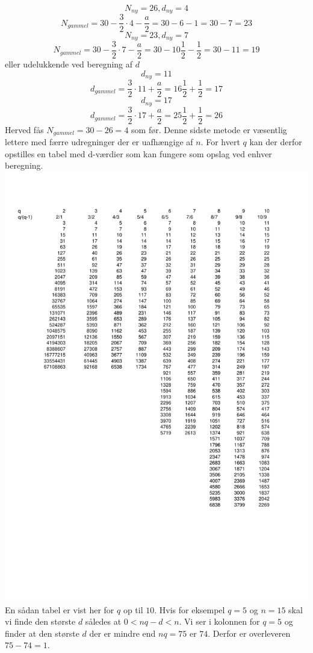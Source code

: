 \[N_{ny}=26, d_{ny}=4\]
\[ N_{gammel}=30-\frac{3}{2} \cdot 4 -\frac{a}{2}=30-6-1=30-7=23\]
\[N_{ny}=23, d_{ny}=7\]
\[ N_{gammel}=30-\frac{3}{2} \cdot 7 -\frac{a}{2}=30-10\frac{1}{2}-\frac{1}{2}=30-11=19\]
eller udelukkende ved beregning af \(d\)
\[d_{ny}=11\]
\[ d_{gammel}=\frac{3}{2} \cdot 11 +\frac{a}{2}=16\frac{1}{2}+\frac{1}{2}=17\]
\[d_{ny}=17\]
\[ d_{gammel}=\frac{3}{2} \cdot 17 +\frac{a}{2}=25\frac{1}{2}+\frac{1}{2}=26\]
Herved fås \(N_{gammel}=30-26=4\) som før. Denne sidste metode er væsentlig lettere med færre udregninger der er uafhængige af \(n\). For hvert \(q\) kan der derfor opstilles en tabel med d-værdier som kan fungere som opslag ved enhver beregning.
\includegraphics[width=1.0\textwidth]{JosephusTabel}
En sådan tabel er vist her for \(q\) op til \(10\). Hvis for eksempel \(q=5\) og \(n=15\) skal vi finde den største \(d\) således at \(0<nq-d<n\). Vi ser i kolonnen for \(q=5\) og finder at den største \(d\) der er mindre end \(nq=75\) er \(74\). Derfor er overleveren \(75-74=1\).
